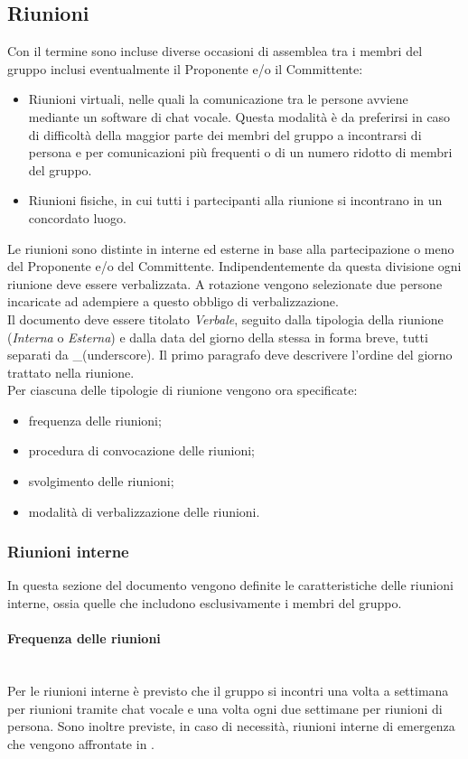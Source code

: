\subsection{Riunioni}
Con il termine  sono incluse diverse occasioni di assemblea tra i membri del gruppo inclusi eventualmente il Proponente e/o il Committente:
\begin{itemize}
\item Riunioni virtuali, nelle quali la comunicazione tra le persone avviene mediante un software di chat vocale. Questa modalità è da preferirsi in caso di difficoltà della maggior parte dei membri del gruppo a incontrarsi di persona e per comunicazioni più frequenti o di un numero ridotto di membri del gruppo.
\item Riunioni fisiche, in cui tutti i partecipanti alla riunione si incontrano in un concordato luogo.	
\end{itemize}
Le riunioni sono distinte in interne ed esterne in base alla partecipazione o meno del Proponente e/o del Committente. Indipendentemente da questa divisione ogni riunione deve essere verbalizzata. A rotazione vengono selezionate due persone incaricate ad adempiere a questo obbligo di verbalizzazione.\\
Il documento deve essere titolato \textit{Verbale}, seguito dalla tipologia della riunione (\textit{Interna} o \textit{Esterna}) e dalla data del giorno della stessa in forma breve, tutti separati da \_(underscore). Il primo paragrafo deve descrivere l'ordine del giorno trattato nella riunione.\\
Per ciascuna delle tipologie di riunione vengono ora specificate:
\begin{itemize}
	\item frequenza delle riunioni;
	\item procedura di convocazione delle riunioni;
	\item svolgimento delle riunioni;
	\item modalità di verbalizzazione delle riunioni.	 
\end{itemize}

\subsubsection{Riunioni interne}
In questa sezione del documento vengono definite le caratteristiche delle riunioni interne, ossia quelle che includono esclusivamente i membri del gruppo.

\paragraph{Frequenza delle riunioni}\mbox{}\\
Per le riunioni interne è previsto che il gruppo si incontri una volta a settimana per riunioni tramite chat vocale e una volta ogni due settimane per riunioni di persona. Sono inoltre previste, in caso di necessità, riunioni interne di emergenza che vengono affrontate in .

